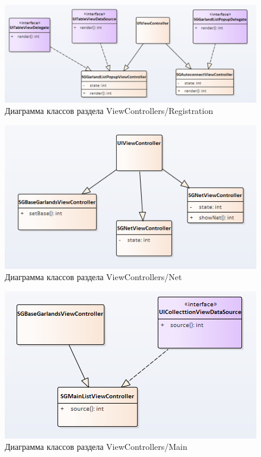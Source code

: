 \label{app:classDiagram}

\begin{figure}[H]
\centering
	\includegraphics[scale=0.5]{figures/diagrams/class/registration.png}
	\caption{Диаграмма классов раздела ViewControllers/Registration}
	\label{fig:appendices:classDiagram:registration}
\end{figure}

\begin{figure}[H]
\centering
	\includegraphics[scale=0.5]{figures/diagrams/class/net.png}
	\caption{Диаграмма классов раздела ViewControllers/Net}
	\label{fig:appendices:classDiagram:net}
\end{figure}

\begin{figure}[H]
\centering
	\includegraphics[scale=0.5]{figures/diagrams/class/mainList.png}
	\caption{Диаграмма классов раздела ViewControllers/Main}
	\label{fig:appendices:classDiagram:mainList}
\end{figure}

